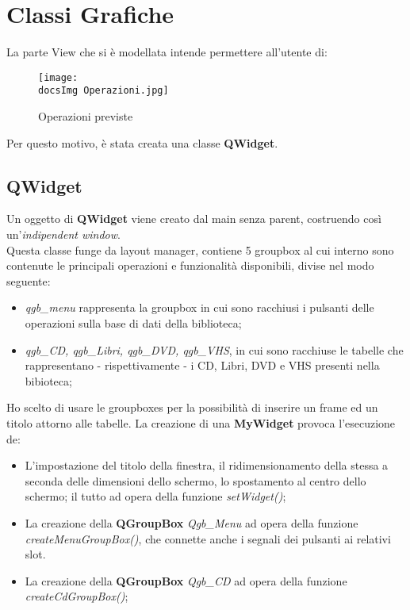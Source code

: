 \section{Classi Grafiche}{
	La parte View che si è modellata intende permettere all'utente di:

	\begin{figure}[h]
			\begin{center}
				\texttt{[image: \\docsImg Operazioni.jpg]}
				\caption{Operazioni previste}
			\end{center}
	\end{figure}
	
	Per questo motivo, è stata creata una classe \textbf{QWidget}.
	\subsection{QWidget}{
		Un oggetto di \textbf{QWidget} viene creato dal main senza parent, costruendo così un'\textit{indipendent window}. \\
		Questa classe funge da layout manager, contiene 5 groupbox al cui interno sono contenute le principali operazioni e funzionalità disponibili, divise nel modo seguente:
	\begin{itemize}\itemsep=0.5pt
		\item \textit{qgb\_menu} rappresenta la groupbox in cui sono racchiusi i pulsanti delle operazioni sulla base di dati della biblioteca;
		\item \textit{qgb\_CD, qgb\_Libri, qgb\_DVD, qgb\_VHS}, in cui sono racchiuse le tabelle che rappresentano - rispettivamente - i CD, Libri, DVD e VHS presenti nella bibioteca;
	\end{itemize}
	Ho scelto di usare le groupboxes per la possibilità di inserire un frame ed un titolo attorno alle tabelle.
	La creazione di una \textbf{MyWidget} provoca l'esecuzione de:
	\begin{itemize}\itemsep=0.5pt
		\item L'impostazione del titolo della finestra, il ridimensionamento della stessa a seconda delle dimensioni dello schermo, lo spostamento al centro dello schermo; il tutto ad opera della funzione \textit{setWidget()}; 
		\item La creazione della \textbf{QGroupBox} \textit{Qgb\_Menu} ad opera della funzione \textit{createMenuGroupBox()}, che connette anche i segnali dei pulsanti ai relativi slot.
		\item La creazione della \textbf{QGroupBox} \textit{Qgb\_CD} ad opera della funzione \textit{createCdGroupBox()};

\end{itemize}}}
